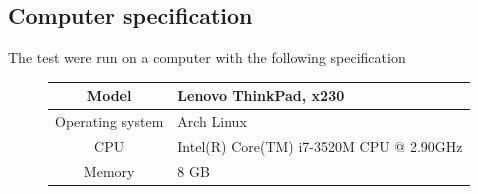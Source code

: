 \subsection{Computer specification}
The test were run on a computer with the following specification
\begin{figure}[H]
\begin{tabular}{| c | l |}
	\hline
	Model & Lenovo ThinkPad, x230 \\
	\hline
	Operating system & Arch Linux \\
	\hline
	CPU & Intel(R) Core(TM) i7-3520M CPU @ 2.90GHz\\
	\hline
	Memory & 8 GB \\
	\hline
\end{tabular}
\end{figure}

